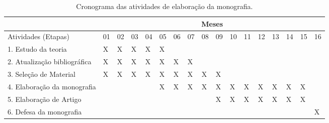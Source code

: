 \begin{table}[h]
\ABNTEXfontereduzida
\caption[Cronograma das atividades]{Cronograma das atividades de elaboração da monografia.}
\label{tab:cronograma}
\begin{minipage}{0.3\textwidth}
    \centering
\begin{tabular}{|l|l|l|l|l|l|l|l|l|l|l|l|l|l|l|l|l|}
\hline
                             & \multicolumn{16}{c|}{Meses}                                                   \\ \hline
Atividades (Etapas)          & 01 & 02 & 03 & 04 & 05 & 06 & 07 & 08 & 09 & 10 & 11 & 12 & 13 & 14 & 15 & 16 \\ \hline
1. Estudo da teoria          & X  & X  & X  & X  & X  &    &    &    &    &    &    &    &    &    &    &    \\ \hline
2. Atualização bibliográfica & X  & X  & X  & X  & X  & X  & X  &    &    &    &    &    &    &    &    &    \\ \hline
3. Seleção de Material       & X  & X  & X  & X  & X  & X  & X  & X  & X  &    &    &    &    &    &    &    \\ \hline
4. Elaboração da monografia  &    &    &    &    & X  & X  & X  & X  & X  & X  & X  & X  & X  & X  & X  &    \\ \hline
5. Elaboração de Artigo      &    &    &    &    &    &    &    &    & X  & X  & X  & X  & X  & X  & X  &    \\ \hline
6. Defesa da monografia      &    &    &    &    &    &    &    &    &    &    &    &    &    &    &    & X  \\ \hline
\end{tabular}
  \end{minipage}
\end{table}